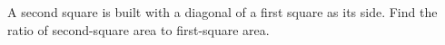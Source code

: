 A second square is built with a diagonal of a first square as its side. Find the ratio of second-square area to first-square area.
